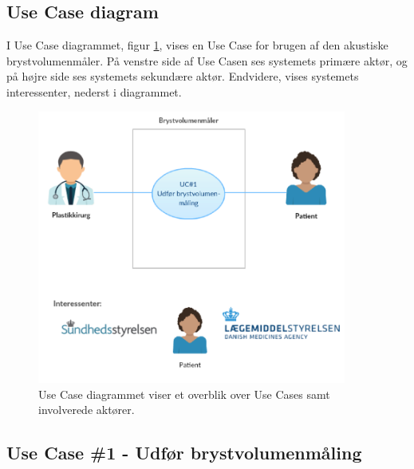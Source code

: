 	\pagebreak
	
		\subsection{Use Case diagram}
		I Use Case diagrammet, figur \ref{fig:UC1}, vises en Use Case for brugen af den akustiske brystvolumenmåler. På venstre side af Use Casen ses systemets primære aktør, og på højre side ses systemets sekundære aktør. Endvidere, vises systemets interessenter, nederst i diagrammet.  
	
			\begin{figure}[htb]
				\centering
					\includegraphics[width=4in]{UC1.png}
					\caption{Use Case diagrammet viser et overblik over Use Cases samt involverede aktører.}
					\label{fig:UC1}
			\end{figure}	 
	\pagebreak	
	\newpage	
  
  		\subsection{Use Case \#1 - Udfør brystvolumenmåling}
  			

